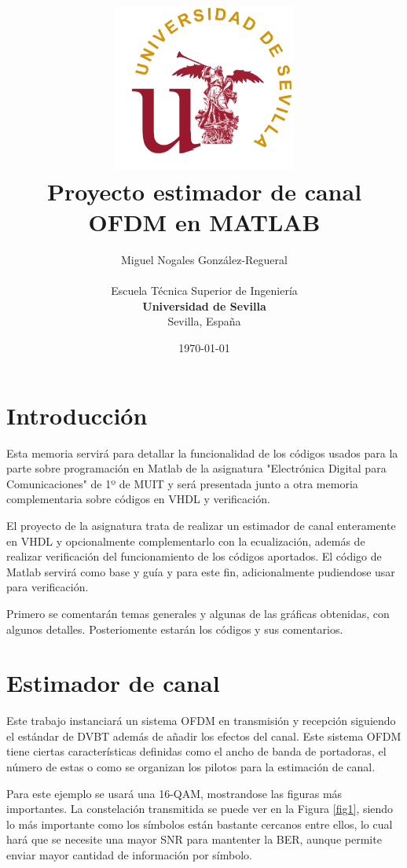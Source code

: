 \documentclass[11pt]{scrartcl} %
\title{
\includegraphics[width=6cm]{Figures/Logo_US.png} \\
\vspace*{1in}
\textbf{Proyecto estimador de canal OFDM en MATLAB}}
\author{Miguel Nogales González-Regueral \\
		\vspace*{0.5in} \\
		Escuela Técnica Superior de Ingeniería\\
        \textbf{Universidad de Sevilla}\\
        Sevilla, España
       } \date{\today}
\begin{document}
\begin{preview}

\maketitle %

\Newpage

\section{Introducción}

Esta memoria servirá para detallar la funcionalidad de los códigos usados para la parte sobre programación en Matlab de la asignatura "Electrónica Digital para Comunicaciones" de 1º de MUIT y será presentada junto a otra memoria complementaria sobre códigos en VHDL y verificación. 

El proyecto de la asignatura trata de realizar un estimador de canal enteramente en VHDL y opcionalmente complementarlo con la ecualización, además de realizar verificación del funcionamiento de los códigos aportados. El código de Matlab servirá como base y guía y para este fin, adicionalmente pudiendose usar para verificación.

Primero se comentarán temas generales y algunas de las gráficas obtenidas, con algunos detalles. Posteriomente estarán los códigos y sus comentarios.

\section{Estimador de canal}

Este trabajo instanciará un sistema OFDM en transmisión y recepción siguiendo el estándar de DVBT además de añadir los efectos del canal. Este sistema OFDM tiene ciertas características definidas como el ancho de banda de portadoras, el número de estas o como se organizan los pilotos para la estimación de canal. 

Para este ejemplo se usará una 16-QAM, mostrandose las figuras más importantes. La constelación transmitida se puede ver en la Figura \ref{fig1}, siendo lo más importante como los símbolos están bastante cercanos entre ellos, lo cual hará que se necesite una mayor SNR para mantenter la BER, aunque permite enviar mayor cantidad de información por símbolo.


\end{preview}
\end{document}
